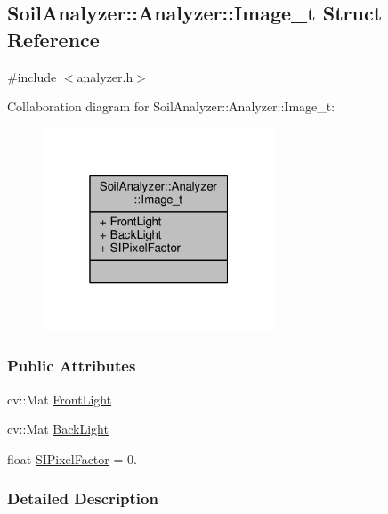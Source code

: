 \hypertarget{struct_soil_analyzer_1_1_analyzer_1_1_image__t}{}\subsection{Soil\+Analyzer\+:\+:Analyzer\+:\+:Image\+\_\+t Struct Reference}
\label{struct_soil_analyzer_1_1_analyzer_1_1_image__t}


{\ttfamily \#include $<$analyzer.\+h$>$}



Collaboration diagram for Soil\+Analyzer\+:\+:Analyzer\+:\+:Image\+\_\+t\+:
\nopagebreak
\begin{figure}[H]
\begin{center}
\leavevmode
\includegraphics[width=196pt]{struct_soil_analyzer_1_1_analyzer_1_1_image__t__coll__graph}
\end{center}
\end{figure}
\subsubsection*{Public Attributes}
\begin{DoxyCompactItemize}
\item 
cv\+::\+Mat \hyperlink{struct_soil_analyzer_1_1_analyzer_1_1_image__t_aea2974c543b090703237f17d0c192699}{Front\+Light}
\item 
cv\+::\+Mat \hyperlink{struct_soil_analyzer_1_1_analyzer_1_1_image__t_a504fc04b0d64945e742c9ac7a48f2598}{Back\+Light}
\item 
float \hyperlink{struct_soil_analyzer_1_1_analyzer_1_1_image__t_a7b7c4dfb4d2ed5da141feed7cfc9cfe9}{S\+I\+Pixel\+Factor} = 0.
\end{DoxyCompactItemize}


\subsubsection{Detailed Description}


